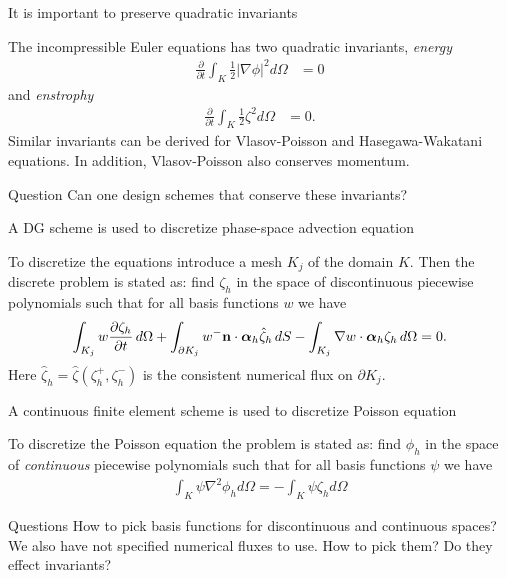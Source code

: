 \documentclass[pdf]{beamer}
\newcommand{\pfrac}[2]{\frac{\partial #1}{\partial #2}}
\newcommand{\pfraca}[1]{\frac{\partial}{\partial #1}}
\newcommand{\mvec}[1]{\mathbf{#1}}
\newcommand{\gvec}[1]{\boldsymbol{#1}}
\newcommand{\mypause}{}
\theoremstyle{definition}
\begin{document}
\begin{frame}{It is important to preserve quadratic invariants}%

  The incompressible Euler equations has two quadratic invariants,
  \emph{energy}
  \begin{align*}
    \pfraca{t}\int_K \frac{1}{2} |\nabla\phi|^2  d\Omega &= 0
  \end{align*}
  and \emph{enstrophy}
  \begin{align*}
    \pfraca{t}\int_K \frac{1}{2}\zeta^2 d\Omega &= 0.
  \end{align*}
  Similar invariants can be derived for Vlasov-Poisson and
  Hasegawa-Wakatani equations.  In addition, Vlasov-Poisson also
  conserves momentum.
  \mypause
  \begin{block}{Question}
    Can one design schemes that conserve these invariants?
  \end{block}

\end{frame}

\begin{frame}{A DG scheme is used to discretize phase-space advection
    equation}

  To discretize the equations introduce a mesh $K_j$ of the domain
  $K$. Then the discrete problem is stated as: find $\zeta_h$ in the
  space of discontinuous piecewise polynomials such that for all basis
  functions $w$ we have
  \begin{align*}
    \int_{K_j} w \pfrac{\zeta_h}{t}\thinspace d\Omega 
    +
    \int_{\partial K_j}w^- \mvec{n}\cdot\gvec{\alpha}_h\hat{\zeta}_h\thinspace dS
    -
    \int_{K_j} \nabla w\cdot\gvec{\alpha}_h \zeta_h\thinspace d\Omega = 0.
  \end{align*}
  Here $\hat{\zeta}_h = \hat{\zeta}(\zeta^+_h,\zeta^-_h)$ is the
  consistent numerical flux on $\partial K_j$.
\end{frame}

\begin{frame}{A continuous finite element scheme is used to discretize
    Poisson equation}

  To discretize the Poisson equation the problem is stated as: find
  $\phi_h$ in the space of \emph{continuous} piecewise polynomials
  such that for all basis functions $\psi$ we have
  \begin{align*}
    \int_K \psi \nabla^2 \phi_h d\Omega = -\int_K \psi \zeta_h d\Omega
  \end{align*}
  \mypause
  \begin{block}{Questions}
    How to pick basis functions for discontinuous and continuous
    spaces? We also have not specified numerical fluxes to use. How to
    pick them?  Do they effect invariants?
  \end{block}
\end{frame}
\end{document}
